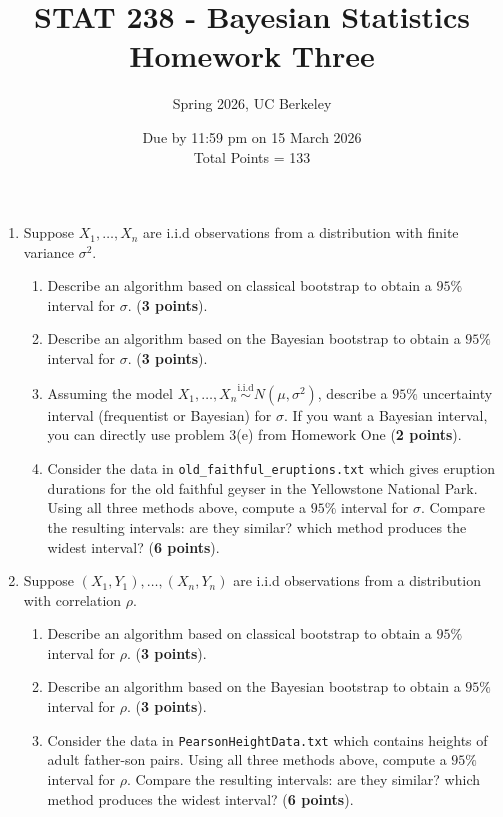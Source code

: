 \documentclass{scrartcl}
\begin{document}
\title{STAT 238 - Bayesian Statistics \\
 Homework Three} 
\subtitle{Spring 2026, UC Berkeley}
\author{Due by 11:59 pm on 15 March 2026 \\ Total Points = 133} 

\date{}
\maketitle




\begin{enumerate}

\item Suppose $X_1, \dots, X_n$ are i.i.d observations from a
  distribution with finite variance $\sigma^2$.
  \begin{enumerate}
  \item Describe an algorithm based on classical bootstrap to obtain a
    $95\%$ interval for $\sigma$. (\textbf{3 points}). 
  \item Describe an algorithm based on the Bayesian bootstrap to
    obtain a  $95\%$ interval for $\sigma$. (\textbf{3 points}).
  \item Assuming the model $X_1, \dots, X_n
    \overset{\text{i.i.d}}{\sim} N(\mu, \sigma^2)$, describe a
    $95\%$ uncertainty interval (frequentist or Bayesian)
    for $\sigma$. If you want a Bayesian interval, you can directly use problem
    3(e) from Homework One (\textbf{2 points}).
  \item Consider the data in \texttt{old\_faithful\_eruptions.txt} which
    gives eruption durations for the old faithful geyser in the
    Yellowstone National Park. Using all three methods above, compute
    a $95\%$ interval for $\sigma$. Compare the resulting intervals:
    are they similar? which method produces the widest interval?
    (\textbf{6 points}). 
  \end{enumerate}

\item Suppose $(X_1, Y_1), \dots, (X_n, Y_n)$ are i.i.d observations
  from a distribution with correlation $\rho$.
  \begin{enumerate}
  \item Describe an algorithm based on classical bootstrap to obtain a
    $95\%$ interval for $\rho$. (\textbf{3 points}). 
  \item Describe an algorithm based on the Bayesian bootstrap to
    obtain a  $95\%$ interval for $\rho$. (\textbf{3 points}).
  \item Consider the data in \texttt{PearsonHeightData.txt} which
    contains heights of adult father-son pairs. Using all three methods above, compute
    a $95\%$ interval for $\rho$. Compare the resulting intervals:
    are they similar? which method produces the widest interval?
    (\textbf{6 points}). 
  \end{enumerate}



\end{enumerate}
\end{document}
